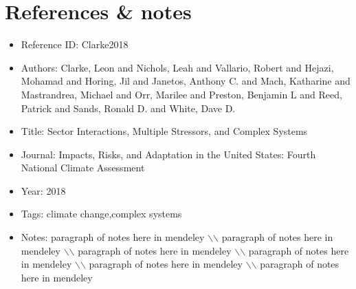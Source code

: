 \documentclass[11pt]{article}
\begin{document}
 
\maketitle 

\section{References \& notes} 
\noindent\citep{Clarke2018} 
\begin{itemize} 
\item{Reference ID:  Clarke2018} 

\item{Authors:  Clarke, Leon and Nichols, Leah and Vallario, Robert and Hejazi, Mohamad and Horing, Jil and Janetos, Anthony C. and Mach, Katharine and Mastrandrea, Michael and Orr, Marilee and Preston, Benjamin L and Reed, Patrick and Sands, Ronald D. and White, Dave D.} 

\item{Title:  Sector Interactions, Multiple Stressors, and Complex Systems} 

\item{Journal:  Impacts, Risks, and Adaptation in the United States: Fourth National Climate Assessment} 

\item{Year:  2018} 

\item{Tags:  climate change,complex systems} 

\item{Notes:  paragraph of notes here in mendeley $\backslash$$\backslash$ paragraph of notes here in mendeley $\backslash$$\backslash$ paragraph of notes here in mendeley $\backslash$$\backslash$ paragraph of notes here in mendeley $\backslash$$\backslash$ paragraph of notes here in mendeley $\backslash$$\backslash$ paragraph of notes here in mendeley} 

\end{itemize}\medskip
\end{document}
